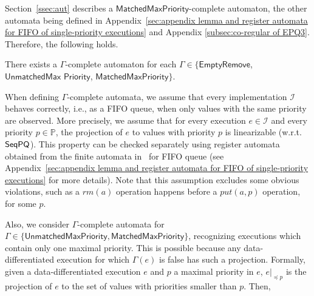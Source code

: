 Section~\ref{ssec:aut} describes a $\mathsf{MatchedMaxPriority}$-complete automaton, the other automata being defined in Appendix~\ref{sec:appendix lemma and register automata for FIFO of single-priority executions} %
and Appendix \ref{subsec:co-regular of EPQ3}. Therefore, the following holds.

\begin{lemma}
There exists a $\Gamma$-complete automaton for each $\Gamma\in \{\mathsf{EmptyRemove}$, $\mathsf{UnmatchedMax}$ $\mathsf{Priority}$, $\mathsf{MatchedMaxPriority}\}$.
\end{lemma}

When defining $\Gamma$-complete automata, we assume that every implementation $\mathcal{I}$ behaves correctly, i.e., as a FIFO queue, when only values with the same priority are observed. More precisely, we assume that for every execution $e\in\mathcal{I}$ and every priority $p\in\mathbb{P}$, the projection of $e$ to values with priority $p$ is linearizable (w.r.t. $\mathsf{SeqPQ}$). This property can be checked separately using register automata obtained from the finite automata in~\cite{DBLP:conf/icalp/BouajjaniEEH15} for FIFO queue (see Appendix~\ref{sec:appendix lemma and register automata for FIFO of single-priority executions} for more details). Note that this assumption excludes some obvious violations, such as a $\textit{rm}(a)$ operation happens before a $\textit{put}(a,p)$ operation, for some $p$.

Also, we consider $\Gamma$-complete automata for $\Gamma\in \{\mathsf{UnmatchedMaxPriority}, \mathsf{MatchedMaxPriority}\}$, recognizing executions which contain only one maximal priority. This is possible because any data-differentiated execution for which $\Gamma(e)$ is false has such a projection.
Formally, given a data-differentiated execution $e$ and $p$ a maximal priority in $e$, $e\vert_{\preceq p}$ is the projection of $e$ to the set of values with priorities smaller than $p$. Then,

